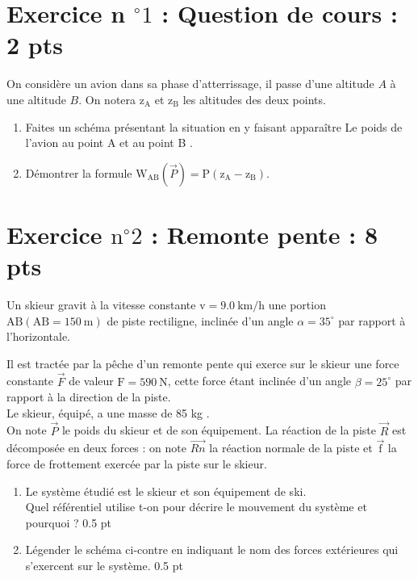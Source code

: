 \documentclass[10pt]{article}
\begin{document}
\captionsetup{singlelinecheck=false}
\section*{Exercice n ${ }^{\circ} 1$ : Question de cours : 2 pts}
On considère un avion dans sa phase d'atterrissage, il passe d'une altitude $A$ à une altitude $B$. On notera $\mathrm{z}_{\mathrm{A}}$ et $\mathrm{z}_{\mathrm{B}}$ les altitudes des deux points.

\begin{enumerate}
  \item Faites un schéma présentant la situation en y faisant apparaître Le poids de l'avion au point A et au point B .
  \item Démontrer la formule $\mathrm{W}_{\mathrm{AB}}(\vec{P})=\mathrm{P}\left(\mathrm{z}_{\mathrm{A}}-\mathrm{z}_{\mathrm{B}}\right)$.
\end{enumerate}

\section*{Exercice $\mathrm{n}^{\circ} 2$ : Remonte pente : 8 pts}
Un skieur gravit à la vitesse constante $\mathrm{v}=9.0 \mathrm{~km} / \mathrm{h}$ une portion $\mathrm{AB}(\mathrm{AB}=150 \mathrm{~m})$ de piste rectiligne, inclinée d'un angle $\alpha=35^{\circ}$ par rapport à l'horizontale.

Il est tractée par la pêche d'un remonte pente qui exerce sur le skieur une force constante $\vec{F}$ de valeur $\mathrm{F}=590 \mathrm{~N}$, cette force étant inclinée d'un angle $\beta=25^{\circ}$ par rapport à la direction de la piste.\\
Le skieur, équipé, a une masse de 85 kg .\\
On note $\vec{P}$ le poids du skieur et de son équipement. La réaction de la piste $\vec{R}$ est décomposée en deux forces : on note $\overrightarrow{R n}$ la réaction normale de la piste et $\overrightarrow{\mathrm{f}}$ la force de frottement exercée par la piste sur le skieur.

\begin{enumerate}
  \item Le système étudié est le skieur et son équipement de ski.\\
Quel référentiel utilise t-on pour décrire le mouvement du système et pourquoi ? 0.5 pt
  \item Légender le schéma ci-contre en indiquant le nom des forces extérieures qui s'exercent sur le système. 0.5 pt
\end{enumerate}
\end{document}
